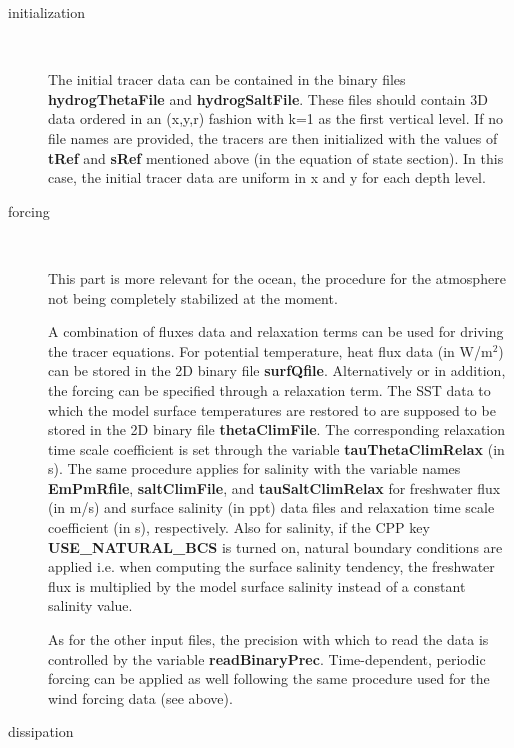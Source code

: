 \begin{description}
\item[initialization] \ 
  
  The initial tracer data can be contained in the binary files
  \textbf{hydrogThetaFile} and \textbf{hydrogSaltFile}. These files
  should contain 3D data ordered in an (x,y,r) fashion with k=1 as the
  first vertical level.  If no file names are provided, the tracers
  are then initialized with the values of \textbf{tRef} and
  \textbf{sRef} mentioned above (in the equation of state section). In
  this case, the initial tracer data are uniform in x and y for each
  depth level.

\item[forcing] \ 
  
  This part is more relevant for the ocean, the procedure for the
  atmosphere not being completely stabilized at the moment.
  
  A combination of fluxes data and relaxation terms can be used for
  driving the tracer equations.  For potential temperature, heat flux
  data (in W/m$ ^{2}$) can be stored in the 2D binary file
  \textbf{surfQfile}.  Alternatively or in addition, the forcing can
  be specified through a relaxation term. The SST data to which the
  model surface temperatures are restored to are supposed to be stored
  in the 2D binary file \textbf{thetaClimFile}. The corresponding
  relaxation time scale coefficient is set through the variable
  \textbf{tauThetaClimRelax} (in s). The same procedure applies for
  salinity with the variable names \textbf{EmPmRfile},
  \textbf{saltClimFile}, and \textbf{tauSaltClimRelax} for freshwater
  flux (in m/s) and surface salinity (in ppt) data files and
  relaxation time scale coefficient (in s), respectively. Also for
  salinity, if the CPP key \textbf{USE\_NATURAL\_BCS} is turned on,
  natural boundary conditions are applied i.e. when computing the
  surface salinity tendency, the freshwater flux is multiplied by the
  model surface salinity instead of a constant salinity value.
  
  As for the other input files, the precision with which to read the
  data is controlled by the variable \textbf{readBinaryPrec}.
  Time-dependent, periodic forcing can be applied as well following
  the same procedure used for the wind forcing data (see above).

\item[dissipation] \ 
  

\end{description}
